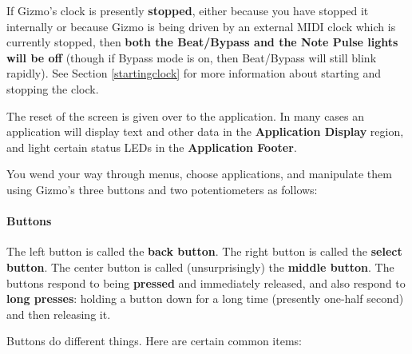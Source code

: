\documentclass{article}
\begin{document}
If Gizmo's clock is presently {\bf stopped}, either because you have stopped it internally or because Gizmo is being driven by an external MIDI clock which is currently stopped, then {\bf both the Beat/Bypass and the Note Pulse lights will be off} (though if Bypass mode is on, then Beat/Bypass will still blink rapidly).  See Section \ref{startingclock} for more information about starting and stopping the clock.

The reset of the screen is given over to the application.  In many cases an application will display text and other data in the {\bf Application Display} region, and light certain status LEDs in the {\bf Application Footer}.

You wend your way through menus, choose applications, and manipulate them using Gizmo's three buttons and two potentiometers as follows:

\paragraph{Buttons}  The left button is called the {\bf back button}.  The right button is called the {\bf select button}.  The center button is called (unsurprisingly) the {\bf middle button}.   The buttons respond to being {\bf pressed} and immediately released, and also respond to {\bf long presses}: holding a button down for a long time (presently one-half second) and then releasing it. 


Buttons do different things.  Here are certain common items:
\end{document}
